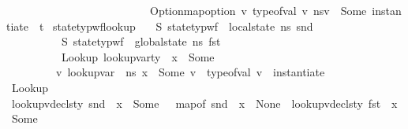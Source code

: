 \begin{isabellebody}
\ \ \ \ \ \ \ \ \ \ \ \ \ \ \ \ \ \ \ \ \ \ \ \ \ \ Option{\isachardot}{\kern0pt}map{\isacharunderscore}{\kern0pt}option\ {\isacharparenleft}{\kern0pt}{\isasymlambda}v{\isachardot}{\kern0pt}\ type{\isacharunderscore}{\kern0pt}of{\isacharunderscore}{\kern0pt}val\ v{\isacharparenright}{\kern0pt}\ {\isacharparenleft}{\kern0pt}ns{\isacharparenleft}{\kern0pt}v{\isacharparenright}{\kern0pt}{\isacharparenright}{\kern0pt}\ {\isacharequal}{\kern0pt}\ {\isacharparenleft}{\kern0pt}Some\ {\isacharparenleft}{\kern0pt}instantiate\ {\isasymOmega}\ t{\isacharparenright}{\kern0pt}{\isacharparenright}{\kern0pt}{\isacharparenright}{\kern0pt}{\isachardoublequoteclose}\isanewline
\isanewline
{}\isamarkupfalse%
\ state{\isacharunderscore}{\kern0pt}typ{\isacharunderscore}{\kern0pt}wf{\isacharunderscore}{\kern0pt}lookup{\isacharcolon}{\kern0pt}\isanewline
\ \ \ S{}{\isacharcolon}{\kern0pt}\ {\isachardoublequoteopen}state{\isacharunderscore}{\kern0pt}typ{\isacharunderscore}{\kern0pt}wf\ {\isasymOmega}\ {\isacharparenleft}{\kern0pt}local{\isacharunderscore}{\kern0pt}state\ ns{\isacharparenright}{\kern0pt}\ {\isacharparenleft}{\kern0pt}snd\ {\isasymLambda}{\isacharparenright}{\kern0pt}{\isachardoublequoteclose}\ \ \isanewline
\ \ \ \ \ \ \ \ \ \ S{}{\isacharcolon}{\kern0pt}\ {\isachardoublequoteopen}state{\isacharunderscore}{\kern0pt}typ{\isacharunderscore}{\kern0pt}wf\ {\isasymOmega}\ {\isacharparenleft}{\kern0pt}global{\isacharunderscore}{\kern0pt}state\ ns{\isacharparenright}{\kern0pt}\ {\isacharparenleft}{\kern0pt}fst\ {\isasymLambda}{\isacharparenright}{\kern0pt}{\isachardoublequoteclose}\ \isanewline
\ \ \ \ \ \ \ \ \ \ Lookup{\isacharcolon}{\kern0pt}\ {\isachardoublequoteopen}lookup{\isacharunderscore}{\kern0pt}var{\isacharunderscore}{\kern0pt}ty\ {\isasymLambda}\ x\ {\isacharequal}{\kern0pt}\ Some\ {\isasymtau}{\isachardoublequoteclose}\isanewline
\ \ \ \ \ \ \ \ \ {\isachardoublequoteopen}{\isasymexists}v{\isachardot}{\kern0pt}\ lookup{\isacharunderscore}{\kern0pt}var\ {\isasymLambda}\ ns\ x\ {\isacharequal}{\kern0pt}\ Some\ v\ {\isasymand}\ type{\isacharunderscore}{\kern0pt}of{\isacharunderscore}{\kern0pt}val\ v\ {\isacharequal}{\kern0pt}\ instantiate\ {\isasymOmega}\ {\isasymtau}{\isachardoublequoteclose}\isanewline
%
\isadelimproof
%
\endisadelimproof
%
\isatagproof
{}\isamarkupfalse%
\ {\isacharminus}{\kern0pt}\isanewline
\ \ \isamarkupfalse%
\ Lookup\ \isamarkupfalse%
\ {\isachardoublequoteopen}lookup{\isacharunderscore}{\kern0pt}vdecls{\isacharunderscore}{\kern0pt}ty\ {\isacharparenleft}{\kern0pt}snd\ {\isasymLambda}{\isacharparenright}{\kern0pt}\ x\ {\isacharequal}{\kern0pt}\ Some\ {\isasymtau}\ {\isasymor}\ {\isacharparenleft}{\kern0pt}map{\isacharunderscore}{\kern0pt}of\ {\isacharparenleft}{\kern0pt}snd\ {\isasymLambda}{\isacharparenright}{\kern0pt}\ x\ {\isacharequal}{\kern0pt}\ None\ {\isasymand}\ lookup{\isacharunderscore}{\kern0pt}vdecls{\isacharunderscore}{\kern0pt}ty\ {\isacharparenleft}{\kern0pt}fst\ {\isasymLambda}{\isacharparenright}{\kern0pt}\ x\ {\isacharequal}{\kern0pt}\ Some\ {\isasymtau}{\isacharparenright}{\kern0pt}{\isachardoublequoteclose}\isanewline

\end{isabellebody}
